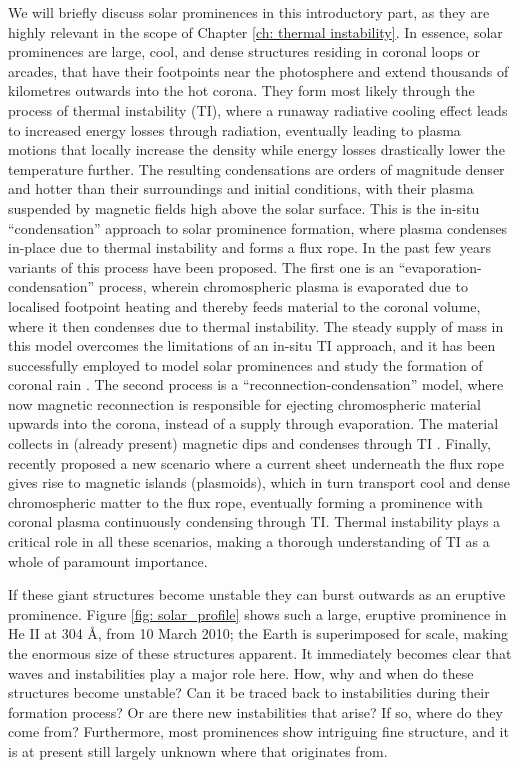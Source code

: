 We will briefly discuss solar prominences in this introductory part, as they are highly relevant in the scope of Chapter \ref{ch: thermal instability}. In essence, solar prominences are large, cool, and dense structures residing in coronal loops or arcades, that have their footpoints near the photosphere and extend thousands of kilometres outwards into the hot corona. They form most likely through the process of thermal instability (TI), where a runaway radiative cooling effect leads to increased energy losses through radiation, eventually leading to plasma motions that locally increase the density while energy losses drastically lower the temperature further. The resulting condensations are orders of magnitude denser and hotter than their surroundings and initial conditions, with their plasma suspended by magnetic fields high above the solar surface. This is the in-situ ``condensation'' approach to solar prominence formation, where plasma condenses in-place due to thermal instability and forms a flux rope. In the past few years variants of this process have been proposed.
The first one is an ``evaporation-condensation'' process, wherein chromospheric plasma is evaporated due to localised footpoint heating and thereby feeds material to the coronal volume, where it then condenses due to thermal instability. The steady supply of mass in this model overcomes the limitations of an in-situ TI approach, and it has been successfully employed to model solar prominences \citep{kaneko2015,xia2016,jenkins2021} and study the formation of coronal rain \citep{fang2013,moschou2015,xia2017}. The second process is a ``reconnection-condensation'' model, where now magnetic reconnection is responsible for ejecting chromospheric material upwards into the corona, instead of a supply through evaporation. The material collects in (already present) magnetic dips and condenses through TI \citep{kaneko2017}. Finally, \citet{zhao2022} recently proposed a new scenario where a current sheet underneath the flux rope gives rise to magnetic islands (plasmoids), which in turn transport cool and dense chromospheric matter to the flux rope, eventually forming a prominence with coronal plasma continuously condensing through TI. Thermal instability plays a critical role in all these scenarios, making a thorough understanding of TI as a whole of paramount importance.

If these giant structures become unstable they can burst outwards as an eruptive prominence. Figure \ref{fig: solar_profile} shows such a large, eruptive prominence in He II at 304 \AA, from 10 March 2010; the Earth is superimposed for scale, making the enormous size of these structures apparent. It immediately becomes clear that waves and instabilities play a major role here. How, why and when do these structures become unstable? Can it be traced back to instabilities during their formation process? Or are there new instabilities that arise? If so, where do they come from? Furthermore, most prominences show intriguing fine structure, and it is at present still largely unknown where that originates from.

